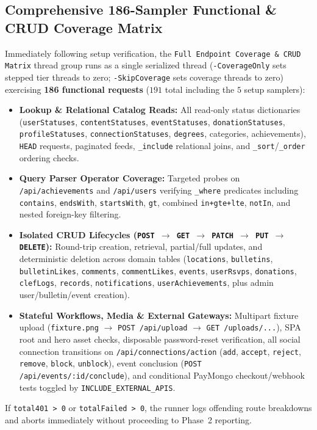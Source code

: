 \documentclass[11pt,letterpaper]{article}
\begin{document}
\subsection{Comprehensive 186-Sampler Functional \& CRUD Coverage Matrix}
Immediately following setup verification, the \texttt{Full Endpoint Coverage \& CRUD Matrix} thread group runs as a single serialized thread (\texttt{-CoverageOnly} sets stepped tier threads to zero; \texttt{-SkipCoverage} sets coverage threads to zero) exercising \textbf{186 functional requests} ($191$ total including the $5$ setup samplers):
\begin{itemize}
  \item \textbf{Lookup \& Relational Catalog Reads:} All read-only status dictionaries (\texttt{userStatuses}, \texttt{contentStatuses}, \texttt{eventStatuses}, \texttt{donationStatuses}, \texttt{profileStatuses}, \texttt{connectionStatuses}, \texttt{degrees}, categories, achievements), \texttt{HEAD} requests, paginated feeds, \texttt{\_include} relational joins, and \texttt{\_sort}/\texttt{\_order} ordering checks.
  \item \textbf{Query Parser Operator Coverage:} Targeted probes on \texttt{/api/achievements} and \texttt{/api/users} verifying \texttt{\_where} predicates including \texttt{contains}, \texttt{endsWith}, \texttt{startsWith}, \texttt{gt}, combined \texttt{in+gte+lte}, \texttt{notIn}, and nested foreign-key filtering.
  \item \textbf{Isolated CRUD Lifecycles (\texttt{POST $\to$ GET $\to$ PATCH $\to$ PUT $\to$ DELETE}):} Round-trip creation, retrieval, partial/full updates, and deterministic deletion across domain tables (\texttt{locations}, \texttt{bulletins}, \texttt{bulletinLikes}, \texttt{comments}, \texttt{commentLikes}, \texttt{events}, \texttt{userRsvps}, \texttt{donations}, \texttt{clefLogs}, \texttt{records}, \texttt{notifications}, \texttt{userAchievements}, plus admin user/bulletin/event creation).
  \item \textbf{Stateful Workflows, Media \& External Gateways:} Multipart fixture upload (\texttt{fixture.png} $\to$ \texttt{POST /api/upload} $\to$ \texttt{GET /uploads/...}), SPA root and hero asset checks, disposable password-reset verification, all social connection transitions on \texttt{/api/connections/action} (\texttt{add}, \texttt{accept}, \texttt{reject}, \texttt{remove}, \texttt{block}, \texttt{unblock}), event conclusion (\texttt{POST /api/events/:id/conclude}), and conditional PayMongo checkout/webhook tests toggled by \texttt{INCLUDE\_EXTERNAL\_APIS}.
\end{itemize}
If \texttt{total401 > 0} or \texttt{totalFailed > 0}, the runner logs offending route breakdowns and aborts immediately without proceeding to Phase~2 reporting.
\end{document}
